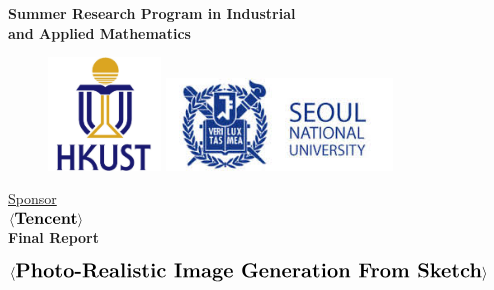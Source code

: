 \thispagestyle{empty}

\def\shiftdowna{0.32in}  %
\def\shiftdownb{0.22in}  %


\begin{center}
\textbf{{\large Summer Research Program in Industrial \\ and Applied Mathematics}}\\

\vspace \shiftdowna

\begin{figure}[h]
  \centering
  \begin{minipage}[b]{0.4\textwidth}
    \centering
    \includegraphics[width=3cm]{Graphics/HKUST_logo.jpg}
      \end{minipage}
  \begin{minipage}[b]{0.4\textwidth}
    \centering
    \includegraphics[width=6cm]{Graphics/snu_logo.jpg}
      \end{minipage}
\end{figure}

\vspace \shiftdowna
\underline {Sponsor}\\ 
\vspace{5pt}
$\langle \textbf{{\large Tencent}} \rangle$ \\
\vspace \shiftdowna
\textbf{Final Report}

\vspace \shiftdowna
$\langle \textbf{{\Large Photo-Realistic Image Generation From Sketch}}\rangle$



\end{center}

